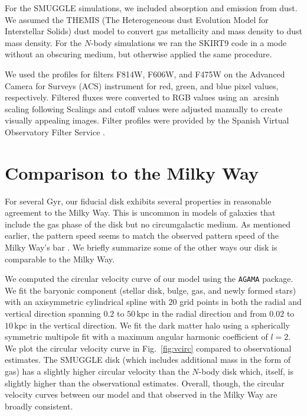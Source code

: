 \documentclass[fleqn,usenatbib]{mnras}
\newcommand{\Nbody}{$N$-body}
\DeclareMathOperator\arcsinh{arcsinh}
\begin{document}
For the SMUGGLE simulations, we included absorption and emission from dust. We
assumed the THEMIS (The Heterogeneous dust Evolution Model for Interstellar
Solids) dust model \citep{2017AA...602A..46J} to convert gas metallicity and
mass density to dust mass density. For the \Nbody{} simulations we ran the
SKIRT9 code in a mode without an obscuring medium, but otherwise applied the
same procedure.

We used the profiles for filters F814W, F606W, and F475W on the Advanced
Camera for Surveys (ACS) instrument for red, green, and blue pixel values,
respectively. Filtered fluxes were converted to RGB values using an $\arcsinh$
scaling following \citet{2004PASP..116..133L} Scalings and cutoff values
were adjusted manually to create visually appealing images. Filter profiles
were provided by the Spanish Virtual Observatory Filter
Service \citep{2012ivoa.rept.1015R, 2020sea..confE.182R}.

\section{Comparison to the Milky Way}
\label{app:milkyway}
For several Gyr, our fiducial disk exhibits several properties in reasonable
agreement to the Milky Way. This is uncommon in models of galaxies that include
the gas phase of the disk but no circumgalactic medium. As mentioned earlier,
the pattern speed seems to match the observed pattern speed of the Milky Way's
bar \citep{2019MNRAS.490.4740B}. We briefly summarize some of the other ways our
disk is comparable to the Milky Way.

We computed the circular velocity curve of our model using the \texttt{AGAMA}
package\cite{2019MNRAS.482.1525V}. We fit the baryonic component (stellar disk,
bulge, gas, and newly formed stars) with an axisymmetric cylindrical spline with
$20$ grid points in both the radial and vertical direction spanning $0.2$ to
$50\,\textrm{kpc}$ in the radial direction and from $0.02$ to $10\,\textrm{kpc}$
in the vertical direction. We fit the dark matter halo using a spherically
symmetric multipole fit with a maximum angular harmonic coefficient of $l=2$. We
plot the circular velocity curve in Fig.~\ref{fig:vcirc} compared to
observational estimates\cite{2019ApJ...871..120E}. The SMUGGLE disk (which
includes additional mass in the form of gas) has a slightly higher circular
velocity than the \Nbody{} disk which, itself, is slightly higher than the
observational estimates. Overall, though, the circular velocity curves between
our model and that observed in the Milky Way are broadly consistent.
\end{document}
